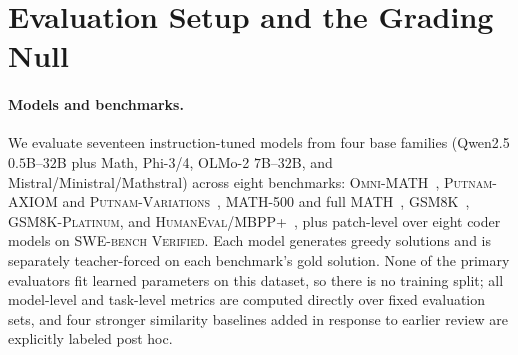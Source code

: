 \section{Evaluation Setup and the Grading Null}
\label{sec:setup-null}

\paragraph{Models and benchmarks.}
We evaluate seventeen instruction-tuned models from four base families (Qwen2.5 $0.5$B--$32$B plus Math, Phi-3/4, OLMo-2 $7$B--$32$B, and Mistral/Ministral/Mathstral) across eight benchmarks: \textsc{Omni-MATH}~\citep{gao2024omnimath}, \textsc{Putnam-AXIOM} and \textsc{Putnam-Variations}~\citep{gulati2025putnam}, \textsc{MATH-500} and full \textsc{MATH}~\citep{hendrycks2021math}, \textsc{GSM8K}~\citep{cobbe2021gsm8k}, \textsc{GSM8K-Platinum}, and \textsc{HumanEval}/\textsc{MBPP+}~\citep{chen2021codex,austin2021mbpp,liu2023evalplus}, plus patch-level \tfa{} over eight coder models on \textsc{SWE-bench Verified}.
Each model generates greedy solutions and is separately teacher-forced on each benchmark's gold solution.
None of the primary evaluators fit learned parameters on this dataset, so there is no training split; all model-level and task-level metrics are computed directly over fixed evaluation sets, and four stronger similarity baselines added in response to earlier review are explicitly labeled post hoc.

